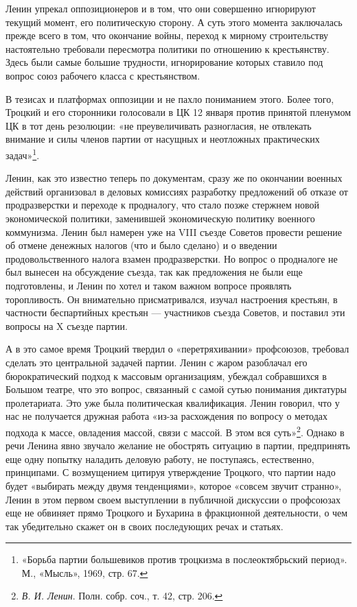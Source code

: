 \documentclass[12pt, a4paper, openany]{book}
\begin{document}
Ленин упрекал оппозиционеров и в том, что они совершенно игнорируют текущий момент, его политическую сторону. А суть этого момента заключалась прежде всего в том, что окончание войны, переход к мирному строительству настоятельно требовали пересмотра политики по отношению к крестьянству. Здесь были самые большие трудности, игнорирование которых ставило под вопрос союз рабочего класса с крестьянством.

В тезисах и платформах оппозиции и не пахло пониманием этого. Более того, Троцкий и его сторонники голосовали в ЦК 12 января против принятой пленумом ЦК в тот день резолюции: «не преувеличивать разногласия, не отвлекать внимание и силы членов партии от насущных и неотложных практических задач»\footnote{«Борьба партии большевиков против троцкизма в послеоктябрьский период». М., «Мысль», 1969, стр. 67.}.

Ленин, как это известно теперь по документам, сразу же по окончании военных действий организовал в деловых комиссиях разработку предложений об отказе от продразверстки и переходе к продналогу, что стало позже стержнем новой экономической политики, заменившей экономическую политику военного коммунизма. Ленин был намерен уже на VIII съезде Советов провести решение об отмене денежных налогов (что и было сделано) и о введении продовольственного налога взамен продразверстки. Но вопрос о продналоге не был вынесен на обсуждение съезда, так как предложения не были еще подготовлены, и Ленин по хотел и таком важном вопросе проявлять торопливость. Он внимательно присматривался, изучал настроения крестьян, в частности беспартийных крестьян — участников съезда Советов, и поставил эти вопросы на X съезде партии.

А в это самое время Троцкий твердил о «перетряхивании» профсоюзов, требовал сделать это центральной задачей партии. Ленин с жаром разоблачал его бюрократический подход к массовым организациям, убеждал собравшихся в Большом театре, что это вопрос, связанный с самой сутью понимания диктатуры пролетариата. Это уже была политическая квалификация. Ленин говорил, что у нас не получается дружная работа «из-за расхождения по вопросу о методах подхода к массе, овладения массой, связи с массой. В этом вся суть»\footnote{\textit{В. И. Ленин}. Полн. собр. соч., т. 42, стр. 206.}. Однако в речи Ленина явно звучало желание не обострять ситуацию в партии, предпринять еще одну попытку наладить деловую работу, не поступаясь, естественно, принципами. С возмущением цитируя утверждение Троцкого, что партии надо будет «выбирать между двумя тенденциями», которое «совсем звучит странно», Ленин в этом первом своем выступлении в публичной дискуссии о профсоюзах еще не обвиняет прямо Троцкого и Бухарина в фракционной деятельности, о чем так убедительно скажет он в своих последующих речах и статьях.
\end{document}
